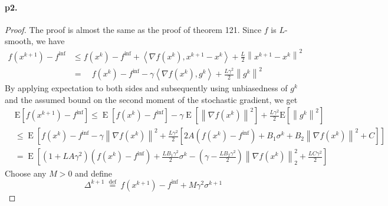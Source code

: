 \documentclass[12pt,a4paper]{article}
\DeclareMathOperator{\E}{\mathrm{E}}
\begin{document}
	
	
	\paragraph{p2.}
	\begin{proof}
	The proof is almost the same as the proof of theorem 121.
	Since $f$ is $L$-smooth, we have
	$$
	\begin{aligned}
		f\left(x^{k+1}\right)-f^{\mathrm{inf}} & \leq f\left(x^{k}\right)-f^{\mathrm{inf}}+\left\langle\nabla f\left(x^{k}\right), x^{k+1}-x^{k}\right\rangle+\frac{L}{2}\left\|x^{k+1}-x^{k}\right\|^{2} \\
		& \stackrel{}{=} \quad f\left(x^{k}\right)-f^{\mathrm{inf}}-\gamma\left\langle\nabla f\left(x^{k}\right), g^{k}\right\rangle+\frac{L \gamma^{2}}{2}\left\|g^{k}\right\|^{2}
	\end{aligned}
	$$
	By applying expectation to both sides and subsequently using unbiasedness of $g^{k}$ and the assumed bound on the second moment of the stochastic gradient, we get
	$$
	\begin{aligned}
		&\mathrm{E}\left[f\left(x^{k+1}\right)-f^{\mathrm{inf}} \right]  \stackrel{}{\leq} \E\left [f\left(x^{k}\right)-f^{\mathrm{inf}}\right ]-\gamma\E\left[\left\|\nabla f\left(x^{k}\right)\right\|^{2}\right]+\frac{L \gamma^{2}}{2} \mathrm{E}\left[\left\|g^{k}\right\|^{2} \right] \\
		&\leq\E\left[ f\left(x^{k}\right)-f^{\mathrm{inf}}-\gamma\left\|\nabla f\left(x^{k}\right)\right\|^{2}+\frac{L \gamma^{2}}{2}\left[2 A\left(f\left(x^{k}\right)-f^{\mathrm{inf}}\right)+B_{1} \sigma^{k}+B_{2}\left\|\nabla f\left(x^{k}\right)\right\|^{2}+C\right] \right]\\
		&=\E\left[\left(1+L A \gamma^{2}\right)\left(f\left(x^{k}\right)-f^{\mathrm{inf}}\right)+\frac{L B_{1} \gamma^{2}}{2} \sigma^{k} -\left(\gamma-\frac{L B_{2} \gamma^{2}}{2}\right)\left\|\nabla f\left(x^{k}\right)\right\|_{2}^{2}+\frac{L C \gamma^{2}}{2}\right]
	\end{aligned}
	$$
	Choose any $M>0$ and define
	$$
	\Delta^{k+1} \stackrel{\text { def }}{=} f\left(x^{k+1}\right)-f^{\mathrm{inf}}+M \gamma^{2} \sigma^{k+1}
	$$
	

\end{proof}
\end{document}
